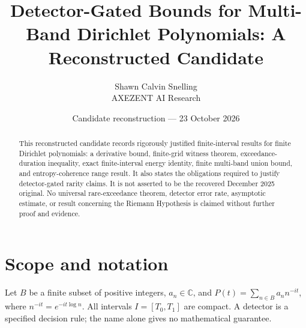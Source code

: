 \documentclass[11pt]{article}
\title{Detector-Gated Bounds for Multi-Band Dirichlet Polynomials: A Reconstructed Candidate}
\author{Shawn Calvin Snelling\\\small AXEZENT AI Research}
\date{Candidate reconstruction --- 23 October 2026}
\theoremstyle{definition}\newtheorem{definition}[theorem]{Definition}
\theoremstyle{remark}\newtheorem{remark}[theorem]{Remark}
\begin{document}
\maketitle
\begin{abstract}
This reconstructed candidate records rigorously justified finite-interval results for finite Dirichlet polynomials: a derivative bound, finite-grid witness theorem, exceedance-duration inequality, exact finite-interval energy identity, finite multi-band union bound, and entropy-coherence range result. It also states the obligations required to justify detector-gated rarity claims. It is not asserted to be the recovered December 2025 original. No universal rare-exceedance theorem, detector error rate, asymptotic estimate, or result concerning the Riemann Hypothesis is claimed without further proof and evidence.
\end{abstract}
\section{Scope and notation}
Let $B$ be a finite subset of positive integers, $a_n\in\mathbb C$, and $P(t)=\sum_{n\in B}a_n n^{-it}$, where $n^{-it}=e^{-it\log n}$. All intervals $I=[T_0,T_1]$ are compact. A detector is a specified decision rule; the name alone gives no mathematical guarantee.
\end{document}
